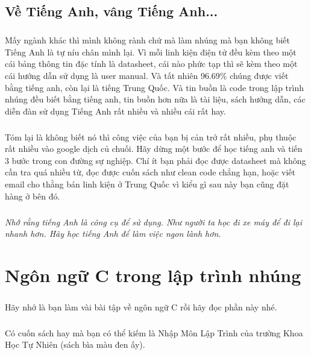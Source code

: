 \documentclass[12pt,a5paper]{book}
\begin{document}
	\section{Về Tiếng Anh, vâng Tiếng Anh...}
		\paragraph{}
	Mấy ngành khác thì mình không rành chứ mà làm nhúng mà bạn không biết Tiếng Anh là tự níu chân mình lại. Vì mỗi linh kiện điện tử đều kèm theo một cái bảng thông tin đặc tính là datasheet, cái nào phức tạp thì sẽ kèm theo một cái hướng dẫn sử dụng là user manual. Và tất nhiên 96.69\% chúng được viết bằng tiếng anh, còn lại là tiếng Trung Quốc. Và tin buồn là code trong lập trình nhúng đều biết bằng tiếng anh, tin buồn hơn nữa là tài liệu, sách hướng dẫn, các diễn đàn sử dụng Tiếng Anh rất nhiều và nhiều cái rất hay.
		\paragraph{}
	Tóm lại là không biết nó thì công việc của bạn bị cản trở rất nhiều, phụ thuộc rất nhiều vào google dịch củ chuối. Hãy dừng một bước để học tiếng anh và tiến 3 bước trong con đường sự nghiệp. Chí ít bạn phải đọc được datasheet mà không cần tra quá nhiều từ, đọc được cuốn sách như clean code chẳng hạn, hoặc viết email cho thằng bán linh kiện ở Trung Quốc vì kiểu gì sau này bạn cũng đặt hàng ở bên đó.
		\paragraph{}
	\textit{Nhớ rằng tiếng Anh là công cụ để sử dụng. Như người ta học đi xe máy để đi lại nhanh hơn. Hãy học tiếng Anh để làm việc ngon lành hơn.}


	\chapter{Ngôn ngữ C trong lập trình nhúng}
	\paragraph{}
Hãy nhớ là bạn làm vài bài tập về ngôn ngữ C rồi hãy đọc phần này nhé.
	\paragraph{}
Có cuốn sách hay mà bạn có thể kiếm là Nhập Môn Lập Trình của trường Khoa Học Tự Nhiên (sách bìa màu đen ấy).\\
\end{document}
